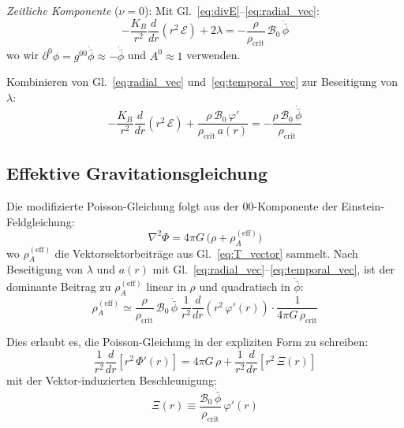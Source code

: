 \documentclass[aps,prd,twocolumn,superscriptaddress,nofootinbib]{revtex4-2}
\begin{document}
\textit{Zeitliche Komponente} ($\nu = 0$): Mit Gl.~\eqref{eq:divE}--\eqref{eq:radial_vec}:
\begin{equation}
-\frac{K_B}{r^2}\frac{d}{dr}\!\left(r^2\,\mathcal{E}\right) + 2\lambda = -\frac{\rho}{\rho_{\mathrm{crit}}}\,\mathcal{B}_0\,\dot{\bar{\phi}}
\label{eq:temporal_vec}
\end{equation}
wo wir $\partial^0\phi = g^{00}\dot{\bar{\phi}} \approx -\dot{\bar{\phi}}$ und $A^0 \approx 1$ verwenden.

Kombinieren von Gl.~\eqref{eq:radial_vec} und~\eqref{eq:temporal_vec} zur Beseitigung von $\lambda$:
\begin{equation}
-\frac{K_B}{r^2}\frac{d}{dr}\!\left(r^2\,\mathcal{E}\right) + \frac{\rho\,\mathcal{B}_0\,\varphi'}{\rho_{\mathrm{crit}}\,a(r)} = -\frac{\rho\,\mathcal{B}_0\,\dot{\bar{\phi}}}{\rho_{\mathrm{crit}}}
\label{eq:combined_vec}
\end{equation}

\subsection{Effektive Gravitationsgleichung}
\label{sec:mod_poisson}

Die modifizierte Poisson-Gleichung folgt aus der $00$-Komponente der Einstein-Feldgleichung:
\begin{equation}
\nabla^2\Phi = 4\pi G\,\bigl(\rho + \rho^{(\mathrm{eff})}_A\bigr)
\label{eq:mod_poisson}
\end{equation}
wo $\rho^{(\mathrm{eff})}_A$ die Vektorsektorbeitr\"age aus Gl.~\eqref{eq:T_vector} sammelt. Nach Beseitigung von $\lambda$ und $a(r)$ mit Gl.~\eqref{eq:radial_vec}--\eqref{eq:temporal_vec}, ist der dominante Beitrag zu $\rho^{(\mathrm{eff})}_A$ linear in $\rho$ und quadratisch in $\dot{\bar{\phi}}$:
\begin{equation}
\rho^{(\mathrm{eff})}_A \simeq \frac{\rho}{\rho_{\mathrm{crit}}}\,\mathcal{B}_0\,\dot{\bar{\phi}}\;\frac{1}{r^2}\frac{d}{dr}\!\left(r^2\,\varphi'(r)\right) \cdot \frac{1}{4\pi G\,\rho_{\mathrm{crit}}}
\label{eq:rho_eff}
\end{equation}

Dies erlaubt es, die Poisson-Gleichung in der expliziten Form zu schreiben:
\begin{equation}
\frac{1}{r^2}\frac{d}{dr}\!\left[r^2\,\Phi'(r)\right] = 4\pi G\,\rho + \frac{1}{r^2}\frac{d}{dr}\!\left[r^2\,\Xi(r)\right]
\label{eq:poisson_Xi}
\end{equation}
mit der Vektor-induzierten Beschleunigung:
\begin{equation}
\Xi(r) \equiv \frac{\mathcal{B}_0\,\dot{\bar{\phi}}}{\rho_{\mathrm{crit}}}\,\varphi'(r)
\label{eq:Xi_def}
\end{equation}
\end{document}
